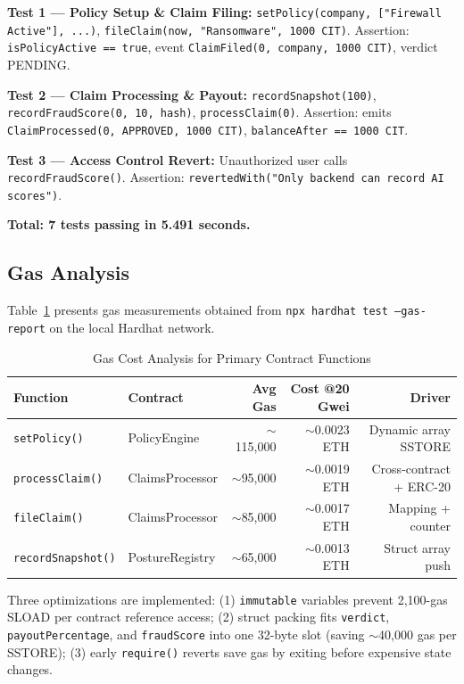 \documentclass[12pt,a4paper]{article}
\begin{document}
\textbf{Test 1 --- Policy Setup \& Claim Filing:}
\texttt{setPolicy(company, ["Firewall Active"], ...)},
\texttt{fileClaim(now, "Ransomware", 1000 CIT)}.
Assertion: \texttt{isPolicyActive == true}, event
\texttt{ClaimFiled(0, company, 1000 CIT)}, verdict PENDING.

\textbf{Test 2 --- Claim Processing \& Payout:}
\texttt{recordSnapshot(100)}, \texttt{recordFraudScore(0, 10, hash)},
\texttt{processClaim(0)}.
Assertion: emits \texttt{ClaimProcessed(0, APPROVED, 1000 CIT)},
\texttt{balanceAfter == 1000 CIT}.

\textbf{Test 3 --- Access Control Revert:}
Unauthorized user calls \texttt{recordFraudScore()}.
Assertion: \texttt{revertedWith("Only backend can record AI scores")}.

\textbf{Total: 7 tests passing in 5.491 seconds.}

\subsection{Gas Analysis}
\label{sec:gas}

Table~\ref{tab:gas} presents gas measurements obtained from
\texttt{npx hardhat test --gas-report} on the local Hardhat network.

\begin{table}[ht]
\centering
\caption{Gas Cost Analysis for Primary Contract Functions}
\label{tab:gas}
\begin{tabular}{@{}llrrr@{}}
\toprule
\rowcolor{gray!15}
\textbf{Function} & \textbf{Contract} & \textbf{Avg Gas} & \textbf{Cost @20 Gwei} & \textbf{Driver} \\
\midrule
\texttt{setPolicy()}       & PolicyEngine    & $\sim$115,000 & $\sim$0.0023 ETH & Dynamic array SSTORE \\
\texttt{processClaim()}    & ClaimsProcessor & $\sim$95,000  & $\sim$0.0019 ETH & Cross-contract + ERC-20 \\
\texttt{fileClaim()}       & ClaimsProcessor & $\sim$85,000  & $\sim$0.0017 ETH & Mapping + counter \\
\texttt{recordSnapshot()}  & PostureRegistry & $\sim$65,000  & $\sim$0.0013 ETH & Struct array push \\
\bottomrule
\end{tabular}
\end{table}

Three optimizations are implemented: (1) \texttt{immutable} variables
prevent 2,100-gas SLOAD per contract reference access; (2) struct
packing fits \texttt{verdict}, \texttt{payoutPercentage}, and
\texttt{fraudScore} into one 32-byte slot (saving $\sim$40,000 gas per
SSTORE); (3) early \texttt{require()} reverts save gas by exiting
before expensive state changes.
\end{document}
